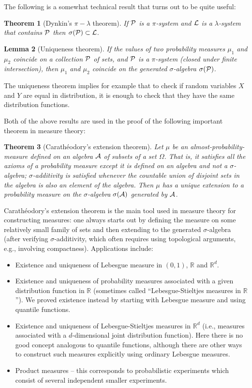 \documentclass[12pt]{article}
\newtheorem{thm}{Theorem}[section]
\newtheorem{lemma}[thm]{Lemma}
\newcommand{\R}{\mathbb{R}}
\theoremstyle{example}
\begin{document}
The following is a somewhat technical result that turns out to be quite useful:

\begin{thm}[Dynkin's $\pi-\lambda$ theorem]
If ${\cal P}$ is a $\pi$-system and ${\cal L}$ is a $\lambda$-system that contains ${\cal P}$ then $\sigma({\cal P}) \subset {\cal L}$.
\end{thm}

\begin{lemma}[Uniqueness theorem] If the values of two probability measures $\mu_1$ and $\mu_2$ coincide on a collection ${\cal P}$ of sets, and ${\cal P}$ is a $\pi$-system (closed under finite intersection), then $\mu_1$ and $\mu_2$ coincide on the generated $\sigma$-algebra $\sigma({\cal P})$.
\end{lemma}

The uniqueness theorem implies for example that to check if random variables $X$ and $Y$ are equal in distribution, it is enough to check that they have the same distribution functions.

Both of the above results are used in the proof of the following important theorem in measure theory:

\begin{thm}[Carath\'eodory's extension theorem]
Let $\mu$ be an almost-probability-measure defined on an algebra ${\cal A}$ of subsets of a set $\Omega$. That is, it satisfies all the axioms of a probability measure except it is defined on an algebra and not a $\sigma$-algebra; $\sigma$-additivity is satisfied whenever the countable union of disjoint sets in the algebra is also an element of the algebra. Then $\mu$ has a unique extension to a probability measure on the $\sigma$-algebra $\sigma({\cal A})$ generated by ${\cal A}$.
\end{thm}

Carath\'eodory's extension theorem is the main tool used in measure theory for constructing measures: one always starts out by defining the measure on some relatively small family of sets and then extending to the generated $\sigma$-algebra (after verifying $\sigma$-additivity, which often requires using topological arguments, e.g., involving compactness). Applications include:
\begin{itemize}
\item Existence and uniqueness of Lebesgue measure in $(0,1)$, $\R$ and $\R^d$.
\item Existence and uniqueness of probability measures associated with a given distribution function in $\R$ (sometimes called ``Lebesgue-Stieltjes measures in $\R$''). We proved existence instead by starting with Lebesgue measure and using quantile functions.
\item Existence and uniqueness of Lebesgue-Stieltjes measures in $\R^d$ (i.e., measures associated with a $d$-dimensional joint distribution function). Here there is no good concept analogous to quantile functions, although there are other ways to construct such measures explicitly using ordinary Lebesgue measures.
\item Product measures -- this corresponds to probabilistic experiments which consist of several independent smaller experiments.
\end{itemize}
\end{document}
